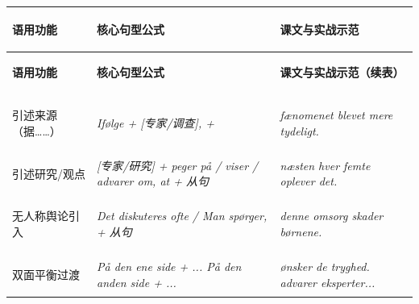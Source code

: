 \vspace{0.25em}
\renewcommand{\arraystretch}{1.24}
{\small
\begin{xltabular}{\linewidth}{@{} >{\bfseries\color{NCDNavy}\raggedright\arraybackslash}p{3.6cm} >{\raggedright\arraybackslash}p{4.3cm} >{\raggedright\arraybackslash}X @{}}
\toprule
\textbf{语用功能} & \textbf{核心句型公式} & \textbf{课文与实战示范} \\
\midrule
\endfirsthead
\toprule
\textbf{语用功能} & \textbf{核心句型公式} & \textbf{课文与实战示范（续表）} \\
\midrule
\endhead
\bottomrule
\endfoot
引述来源（据……） & \textit{Ifølge + [专家/调查], + } & \textit{  fænomenet blevet mere tydeligt.} \\
引述研究/观点 & \textit{[专家/研究] + peger på / viser / advarer om, at + 从句} & \textit{ næsten hver femte oplever det.} \\
无人称舆论引入 & \textit{Det diskuteres ofte / Man spørger,  + 从句} & \textit{ denne omsorg skader børnene.} \\
双面平衡过渡 & \textit{På den ene side + ... På den anden side + ...} & \textit{ ønsker de tryghed.  advarer eksperter...} \\
\end{xltabular}
}

